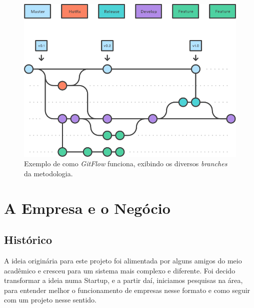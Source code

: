 \documentclass[12pt,a4paper,twoside,hyphens,english,brazil]{abntex2}
\begin{document}
\begin{figure}[!hb]
	\centering
	\includegraphics[width=0.7\linewidth]{imagens/gitflow.png}
	\caption{Exemplo de como \emph{GitFlow} funciona, exibindo os diversos \emph{branches} da metodologia.}
\end{figure}


\chapter{A Empresa e o Negócio}


\section{Histórico}
A ideia originária para este projeto foi alimentada por alguns amigos do meio acadêmico e cresceu para um sistema mais complexo e diferente. Foi decido transformar a ideia numa Startup\footnotemark{}, e a partir daí, iniciamos pesquisas na área, para entender melhor o funcionamento de empresas nesse formato e como seguir com um projeto nesse sentido.
\end{document}
